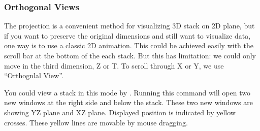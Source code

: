 \subsubsection{Orthogonal Views}

The projection is a convenient method for visualizing 3D stack on 2D plane, but if you want to preserve the original dimensions and still want to visualize data, one way is to use a classic 2D animation. This could be achieved easily with the scroll bar at the bottom of the each stack. But this has limitation: we could only move in the third dimension, Z or T. To scroll through X or Y, we use ``Orthognlal View''. 

You could view a stack in this mode by . Running this command will open two new windows at the right side and below the stack. These two new windows are showing YZ plane and XZ plane. Displayed position is indicated by yellow crosses. These yellow lines are movable by mouse dragging. 

